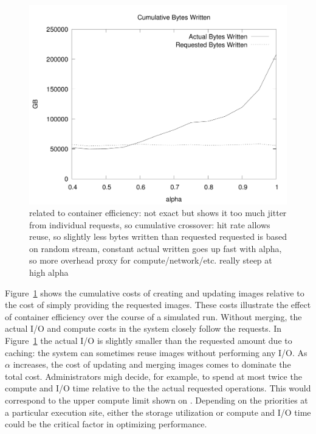 \documentclass[sigconf]{acmart}
\begin{document}
\begin{figure}
\includegraphics[width=\linewidth]{curated/comparative/container_efficiency.pdf}
\label{fig:container-eff}
related to container efficiency: not exact but shows it
too much jitter from individual requests, so cumulative
crossover: hit rate allows reuse, so slightly less bytes written than requested
requested is based on random stream, constant
actual written goes up fast with alpha, so more overhead
proxy for compute/network/etc.
really steep at high alpha
\fi
\end{figure}

Figure~\ref{fig:container-eff} shows the cumulative costs of creating and updating images relative to the cost of simply providing the requested images.
These costs illustrate the effect of container efficiency over the course of a simulated run.
Without merging, the actual I/O and compute costs in the system closely follow the requests.
In Figure~\ref{fig:container-eff} the actual I/O is slightly smaller than the requested amount due to caching:
the system can sometimes reuse images without performing any I/O.
As $\alpha$ increases, the cost of updating and merging images comes to dominate the total cost.
Administrators migh decide, for example,
to spend at most twice the compute and I/O time relative to the the actual requested operations.
This would correspond to the upper compute limit shown on \label{fig:dist-eff}.
Depending on the priorities at a particular execution site,
either the storage utilization or compute and I/O time could be the critical factor in optimizing performance.
\end{document}
